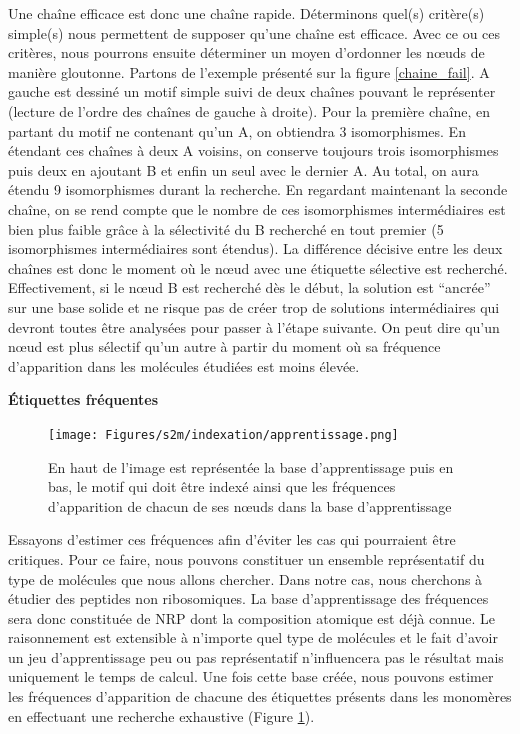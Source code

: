Une chaîne efficace est donc une chaîne rapide.
Déterminons quel(s) critère(s) simple(s) nous permettent de supposer qu'une chaîne est efficace.
Avec ce ou ces critères, nous pourrons ensuite déterminer un moyen d'ordonner les n\oe{}uds de manière gloutonne.
Partons de l'exemple présenté sur la figure \ref{chaine_fail}.
A gauche est dessiné un motif simple suivi de deux chaînes pouvant le représenter (lecture de l'ordre des chaînes de gauche à droite).
Pour la première chaîne, en partant du motif ne contenant qu'un A, on obtiendra 3 isomorphismes.
En étendant ces chaînes à deux A voisins, on conserve toujours trois isomorphismes puis deux en ajoutant B et enfin un seul avec le dernier A.
Au total, on aura étendu 9 isomorphismes durant la recherche.
En regardant maintenant la seconde chaîne, on se rend compte que le nombre de ces isomorphismes intermédiaires est bien plus faible grâce à la sélectivité du B recherché en tout premier (5 isomorphismes intermédiaires sont étendus).
La différence décisive entre les deux chaînes est donc le moment où le n\oe{}ud avec une étiquette sélective est recherché.
Effectivement, si le n\oe{}ud B est recherché dès le début, la solution est ``ancrée'' sur une base solide et ne risque pas de créer trop de solutions intermédiaires qui devront toutes être analysées pour passer à l'étape suivante.
On peut dire qu'un n\oe{}ud est plus sélectif qu'un autre à partir du moment où sa fréquence d'apparition dans les molécules étudiées est moins élevée.

\textbf{Étiquettes fréquentes}

\begin{figure}[!ht]
  \begin{center}
    \texttt{[image: Figures/s2m/indexation/apprentissage.png]}
    \caption{\label{apprentissage}En haut de l'image est représentée la base d'apprentissage puis en bas, le motif qui doit être indexé ainsi que les fréquences d'apparition de chacun de ses n\oe{}uds dans la base d'apprentissage}
  \end{center}
\end{figure}

Essayons d'estimer ces fréquences afin d'éviter les cas qui pourraient être critiques.
Pour ce faire, nous pouvons constituer un ensemble représentatif du type de molécules que nous allons chercher.
Dans notre cas, nous cherchons à étudier des peptides non ribosomiques.
La base d'apprentissage des fréquences sera donc constituée de NRP dont la composition atomique est déjà connue.
Le raisonnement est extensible à n'importe quel type de molécules et le fait d'avoir un jeu d'apprentissage peu ou pas représentatif n'influencera pas le résultat mais uniquement le temps de calcul.
Une fois cette base créée, nous pouvons estimer les fréquences d'apparition de chacune des étiquettes présents dans les monomères en effectuant une recherche exhaustive (Figure \ref{apprentissage}).

